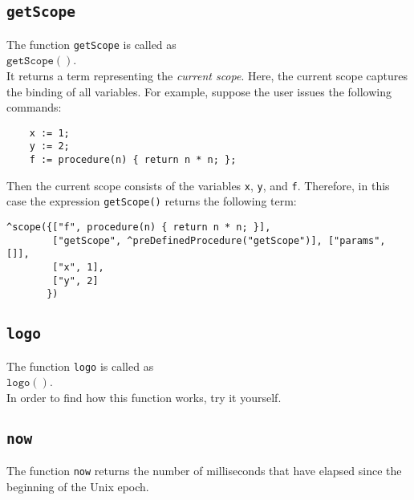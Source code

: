 \subsection{\texttt{getScope}}
The function \texttt{getScope}  is called as
\\[0.2cm]
\hspace*{1.3cm}
$\mathtt{getScope}()$.
\\[0.2cm]
It returns a term representing the  \emph{current scope}.  Here, the current scope
captures the binding of all variables.  For example, suppose the user issues the following
commands: 
\begin{verbatim}
    x := 1;
    y := 2;
    f := procedure(n) { return n * n; };
\end{verbatim}
Then the current scope consists of the variables \texttt{x}, \texttt{y}, and \texttt{f}.
Therefore, in this case the expression \texttt{getScope()} returns the following term:
\begin{verbatim}
^scope({["f", procedure(n) { return n * n; }], 
        ["getScope", ^preDefinedProcedure("getScope")], ["params", []], 
        ["x", 1], 
        ["y", 2]
       })
\end{verbatim}
 
\subsection{\texttt{logo}}
The function \texttt{logo}  is called as
\\[0.2cm]
\hspace*{1.3cm}
$\mathtt{logo}()$.
\\[0.2cm]
In order to find how this function works, try it yourself.

\subsection{\texttt{now}}
The function \texttt{now}  returns the number of milliseconds that have elapsed since
the beginning of the Unix epoch.

